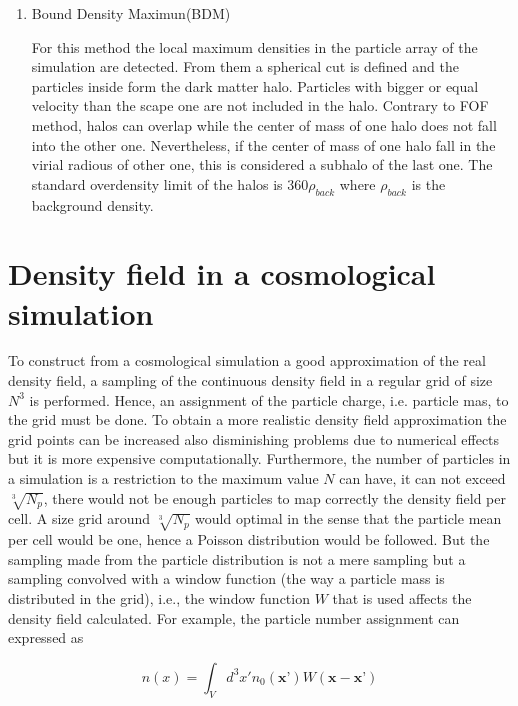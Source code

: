 \begin{enumerate}
\item Bound Density Maximun(BDM)

For this method the local maximum densities in the particle array of the simulation
are detected. From them a spherical cut is defined and the particles inside form 
the dark matter halo. Particles with bigger or equal velocity than the scape one
are not included in the halo. 
Contrary to FOF method, halos can overlap while the center of mass of one halo 
does not fall into the other one. Nevertheless, if the center of mass of one halo
fall in the virial radious of other one, this is considered a subhalo of the last
one. The standard overdensity limit of the halos is $360\rho_{back}$ where $\rho_{back}$
is the background density. 

\end{enumerate}

\section{Density field in a cosmological simulation}

To construct from a cosmological simulation a good approximation of the real density 
field, a sampling of the continuous density field in a regular grid of size $N^3$ is 
performed. Hence, an assignment of the particle charge, i.e. particle mas, to the grid
must be done. To obtain a more realistic density field approximation the grid points 
can be increased also disminishing problems due to numerical effects but it is more
expensive computationally. Furthermore, the number of particles in a simulation is 
a restriction to the maximum value $N$ can have, it can not exceed $\sqrt[3]{N_p}$, there
would not be enough particles to map correctly the density field per cell. A size grid
around $\sqrt[3]{N_p}$ would optimal in the sense that the particle mean per cell would
be one, hence a Poisson distribution would be followed. But the sampling made from the 
particle distribution is not a mere sampling but a sampling convolved with a window 
function (the way a particle mass is distributed in the grid), i.e., the window function
$W$ that is used affects the density field calculated. For example, the particle number
assignment can expressed as

\[n(x) = \int_V d^3 x' n_0(\textbf{x'}) W(\textbf{x}-\textbf{x'})\]

